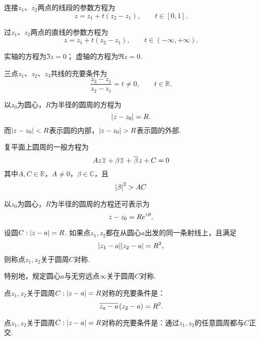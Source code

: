 \begin{example}[线段]
连接\(z_1\)、\(z_2\)两点的线段的参数方程为\[
z = z_1 + t(z_2 - z_1), \qquad t \in [0,1].
\]
\end{example}

\begin{example}[直线]
过\(z_1\)、\(z_2\)两点的直线的参数方程为\[
z = z_1 + t(z_2 - z_1), \qquad t \in (-\infty,+\infty).
\]

实轴的方程为\(\Im z = 0\)；
虚轴的方程为\(\Re z = 0\).
\end{example}

\begin{example}[三点共线的充要条件]
三点\(z_1\)、\(z_2\)、\(z_3\)共线的充要条件为\[
\frac{z_3 - z_1}{z_2 - z_1} = t \neq 0, \qquad t \in \mathbb{R}.
\]
\end{example}

\begin{example}[圆]
以\(z_0\)为圆心，\(R\)为半径的圆周的方程为\[
\abs{z - z_0} = R.
\]而\(\abs{z-z_0}<R\)表示圆的内部，\(\abs{z-z_0}>R\)表示圆的外部.

复平面上圆周的一般方程为\[
A z \kern1pt\overline{z}\kern1pt + \beta \kern1pt\overline{z}\kern1pt + \kern1pt\overline{\beta}\kern1pt z + C = 0
\]其中\(A,C\in\mathbb{R}\)，\(A \neq 0\)，\(\beta\in\mathbb{C}\)，且\[
\abs{\beta}^2 > AC
\]

以\(z_0\)为圆心，\(R\)为半径的圆周的方程还可表示为\[
z - z_0 = R e^{\kern1pt\mathrm{i}\kern1pt \theta}.
\]
\end{example}

\begin{definition}
设圆\(C: \abs{z - a} = R\).
如果点\(z_1,z_2\)都在从圆心\(a\)出发的同一条射线上，且满足\[
\abs{z_1 - a} \abs{z_2 - a} = R^2,
\]则称点\(z_1,z_2\)关于圆周\(C\)对称.

特别地，规定圆心\(a\)与无穷远点\(\infty\)关于圆周\(C\)对称.
\end{definition}

\begin{theorem}
点\(z_1,z_2\)关于圆周\(C: \abs{z - a} = R\)对称的充要条件是：\[
\kern1pt\overline{z_a - a}\kern1pt (z_2 - a) = R^2.
\]
\end{theorem}

\begin{theorem}
点\(z_1,z_2\)关于圆周\(C: \abs{z - a} = R\)对称的充要条件是：通过\(z_1,z_2\)的任意圆周都与\(C\)正交.
\end{theorem}

